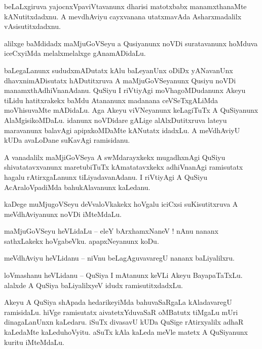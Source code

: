 \documentclass{article}
\begin{document}
\begin{mn}%
beLaLxgiruva yajocnxVpaviVtavanunx dharisi matotxbabx manamxthanaMte kANutitxdadxnu. A mevdhAviyu 
cayxvanana utatxmavAda Asharxmadalilx vAsisutitxdadxnu.
\end{mn}

\begin{mn}%
alilxge baMdidadx maMjuGoVSeyu a Qusiyanunx noVDi suratavanunx hoMduva iceCxyiMda melalxmelalxge 
gAnamADidaLu.
\end{mn}

\begin{mn}%
baLegaLanunx sududxmADutatx kAlu baLeyanUnx oDiDx yANavanUnx dhavxnimADisutatx hADutitxruva A 
maMjuGoVSeyanunx Qusiyu noVDi manamxthAdhiVnanAdanu. QuSiyu I riVtiyAgi moVhagoMDudanunx Akeyu 
tiLidu hatitxrakekx baMdu Atananunx madanana ceVSeTxgALiMda moVhisuvaMte mADidaLu. Aga Akeyu 
viVNeyanunx keLagiTuTx A QuSiyanunx AlaMgisikoMDaLu. idanunx noVDidare gALige alAlxDutitxruva 
lateyu maravanunx balavAgi apipxkoMDaMte kANutatx idadxLu. A meVdhAviyU kUDa avaLoDane suKavAgi 
ramisidanu.
\end{mn}

\begin{mn}%
A vanadalilx maMjiGoVSeya A swMdarayxkekx mugadhxnAgi QuSiyu shivatatavxvanunx maretubiTuTx 
kAmatatavxkekx adhiVnanAgi ramisutatx hagalu rAtirxgaLanunx tiLiyadavanAdanu. I riVtiyAgi A QuSiyu 
AcAraloVpadiMda bahukAlavanunx kaLedanu.
\end{mn}

\begin{mn}%
kaDege muMjugoVSeyu deVvaloVkakekx hoVgalu iciCxsi suKisutitxruva A meVdhAviyanunx noVDi iMteMdaLu.
\end{mn}

\begin{mn}%
maMjuGoVSeyu heVLidaLu -- eleY bArxhamxNaneV ! nAnu nananx sathxLakekx hoVgabeVku. apapxNeyanunx koDu.
\end{mn}

\begin{mn}%
meVdhAviyu heVLidanu -- niVnu beLagAguvavaregU nananx baLiyalilxru.
\end{mn}

\begin{mn}%
loVmashanu heVLidanu -- QuSiya I mAtanunx keVLi Akeyu BayapaTaTxLu. alalxde A QuSiya baLiyalilxyeV 
idudx ramisutitxdadxLu.
\end{mn}

\begin{mn}%
Akeyu A QuSiya shApada hedarikeyiMda bahuvaSaRgaLa kAladavaregU ramisidaLu. hiVge ramisutatx 
aivatetxYduvaSaR oMBatutx tiMgaLu mUri dinagaLanUnxn kaLedaru. iSuTx divasavU kUDa QuSige 
rAtirxyalilx adhaR kaLedaMte kaLeduhoVyitu. aSuTx kAla kaLeda meVle matetx A QuSiyanunx kuritu 
iMteMdaLu.
\end{mn}
\end{document}

